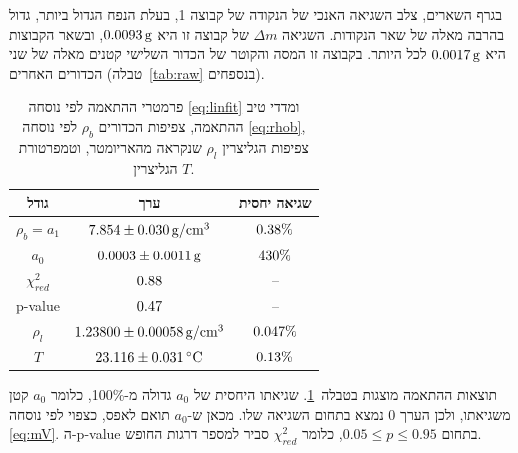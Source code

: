 \documentclass[10pt,a4paper]{article}
\newcommand{\textenglish}[1]{\foreignlanguage{english}{#1}}
\newcommand{\U}[1]{\,\mathrm{#1}}
\begin{document}
בגרף השארים, צלב השגיאה האנכי של הנקודה של קבוצה 1, בעלת הנפח הגדול ביותר, גדול בהרבה מאלה של שאר הנקודות. השגיאה $\Delta m$ של קבוצה זו היא $\DmGroupOne\U{g}$, ובשאר הקבוצות היא $\DmOthersMax\U{g}$ לכל היותר. בקבוצה זו המסה והקוטר של הכדור השלישי קטנים מאלה של שני הכדורים האחרים (טבלה~\ref{tab:raw} בנספחים).

\begin{table}[H]
  \centering
  \renewcommand{\arraystretch}{1.3}
  \begin{tabular}{|c|c|c|}
    \hline
    גודל & ערך & שגיאה יחסית \\ \hline
    $\rho_b = a_1$ & $\RhoB\U{g/cm^3}$ & $0.38\%$ \\ \hline
    $a_0$ & $\DensAZero\U{g}$ & $430\%$ \\ \hline
    $\chi^2_{red}$ & $0.88$ & -- \\ \hline
    \textenglish{p-value} & $0.47$ & -- \\ \hline
    $\rho_l$ & $\RhoL\U{g/cm^3}$ & $0.047\%$ \\ \hline
    $T$ & $\TGly\U{^\circ C}$ & $0.13\%$ \\ \hline
  \end{tabular}
  \caption{פרמטרי ההתאמה לפי נוסחה \eqref{eq:linfit} ומדדי טיב ההתאמה, צפיפות הכדורים $\rho_b$ לפי נוסחה \eqref{eq:rhob}, צפיפות הגליצרין $\rho_l$ שנקראה מהאריומטר, וטמפרטורת הגליצרין $T$.}
  \label{tab:density}
\end{table}
תוצאות ההתאמה מוצגות בטבלה~\ref{tab:density}. שגיאתו היחסית של $a_0$ גדולה מ-100\%, כלומר $a_0$ קטן משגיאתו, ולכן הערך 0 נמצא בתחום השגיאה שלו. מכאן ש-$a_0$ תואם לאפס, כצפוי לפי נוסחה \eqref{eq:mV}. ה-\textenglish{p-value} בתחום $0.05 \le p \le 0.95$, כלומר $\chi^2_{red}$ סביר למספר דרגות החופש.
\end{document}
